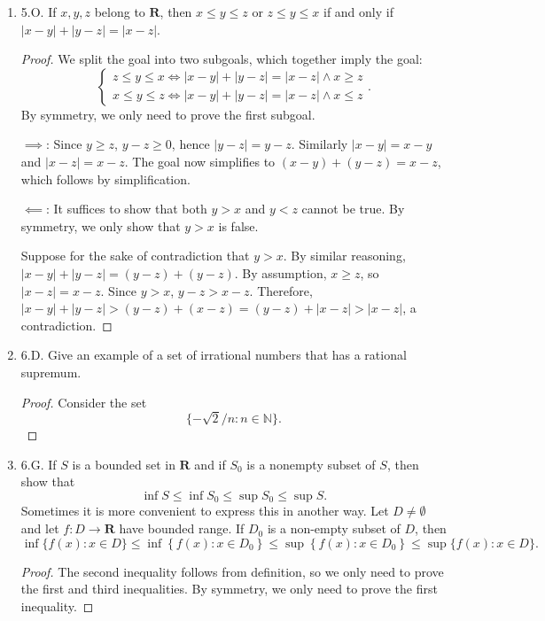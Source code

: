 \begin{enumerate}
\begin{proof}
\end{proof}

	\item 5.O. If $x, y, z$ belong to ${\mathbf{R}}$, then $x \leq y \leq z$ {\color{red} or $z\le y\le x$} if and only if $|x-y|+|y-z|=|x-z|$.
\begin{proof}
	We split the goal into two subgoals, which together imply the goal:
	\[
	\begin{cases}
		z\le y\le x \iff |x-y|+|y-z|=|x-z| \land x\ge z\\
		x\le y\le z \iff |x-y|+|y-z|=|x-z| \land x\le  z
	\end{cases}
	.\] 
	By symmetry, we only need to prove the first subgoal. 

	 $\implies$:
	Since $y\ge z$, $y-z \ge 0$, hence $|y-z| = y-z$. Similarly $|x-y| = x-y $ and $|x-z|=x-z $. The goal now simplifies to $(x-y)+(y-z)=x-z$, which follows by simplification.

	$\impliedby$:
	It suffices to show that both $y>x $ and $y<z $ cannot be true. By symmetry, we only show that $y>x $ is false.
	
	Suppose for the sake of contradiction that $y>x$. By similar reasoning, $|x-y|+|y-z| = (y-z)+(y-z)$. By assumption, $x\ge z$, so $|x-z| = x-z$. Since $y>x$, $y-z>x-z$. Therefore, $|x-y|+|y-z| > (y-z)+(x-z) = (y-z)+|x-z| > |x-z|$, a contradiction. 

\end{proof}
	\item 6.D. Give an example of a set of irrational numbers that has a rational supremum.
\begin{proof}
	Consider the set \[
	\{-\sqrt{2}/n:n \in \mathbb{N} \} 
	.\] 
	
\end{proof}
	\item 6.G. If $S$ is a bounded set in $\boldsymbol{R}$ and if $S_{0}$ is a nonempty subset of $S$, then show that
\[
\inf S \leq \inf S_{0} \leq \sup S_{0} \leq \sup S .
\]
Sometimes it is more convenient to express this in another way. Let $D \neq \emptyset$ and let $f: D \rightarrow \boldsymbol{R}$ have bounded range. If $D_{0}$ is a non-empty subset of $D$, then
\[
\inf \{f(x): x \in D\} \leq \inf \left\{f(x): x \in D_{0}\right\} \leq \sup \left\{f(x): x \in D_{0}\right\} \leq \sup \{f(x): x \in D\} .
\]
\begin{proof}
	The second inequality follows from definition, so we only need to prove the first and third inequalities. By symmetry, we only need to prove the first inequality.


\end{proof}
\end{enumerate}
